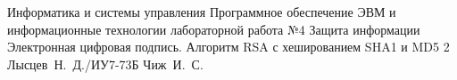 \documentclass{bmstu}
\begin{document}
\makereporttitle
{Информатика и системы управления} %
{Программное обеспечение ЭВМ и информационные технологии}
{лабораторной работа №4} %
{Защита информации} %
{Электронная цифровая подпись. Алгоритм
	RSA с хешированием SHA1 и MD5} %
{2} %
{Лысцев~Н.~Д./ИУ7-73Б} %
{Чиж~И.~С.} %
{}

\maketableofcontents



%

%

\makebibliography
\end{document}
